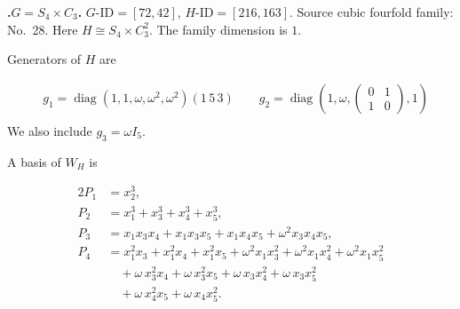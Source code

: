 \documentclass[12pt]{amsart}
\numberwithin{equation}{section}
\theoremstyle{plain}
\theoremstyle{definition}
\theoremstyle{remark}
\DeclareMathOperator{\diag}{diag}
\newenvironment{familydisplay}{%
  \begingroup
  \setlength{\arraycolsep}{1.35pt}%
  \renewcommand{\arraystretch}{0.96}%
  \setlength{\jot}{2pt}%
}{\endgroup}
\newcommand{\smat}[1]{\left(\begin{smallmatrix}#1\end{smallmatrix}\right)}
\begin{document}
\par{}\medskip\noindent\textbf{.\enspace $G=S_4\times C_3$.}\label{fam:threefold-no-6}
$G\text{-ID}=[72,42]$, $H\text{-ID}=[216,163]$.
Source cubic fourfold family: No.~28.  Here
$H\cong S_4\times C_3^2$.
The family dimension is $1$.
\par\smallskip\noindent Generators of $H$ are\par\nopagebreak
\begin{familydisplay}
\begin{align*}
&g_{1}=\diag(1,1,\omega,\omega^2,\omega^2)(1\,5\,3)
\qquad g_{2}=\diag\!\left(1,\omega,\smat{0&1\\1&0},1\right)\\
\end{align*}
\end{familydisplay}
\noindent We also include $g_{3}=\omega I_5$.
\par\smallskip\noindent A basis of $W_H$ is\par\nopagebreak
\begin{familydisplay}
\begin{alignat*}{2}
P_{1}&=x_{2}^{3},\\[2pt]
P_{2}&=x_{1}^{3}+x_{3}^{3}+x_{4}^{3}+x_{5}^{3},\\[2pt]
P_{3}&=x_{1}x_{3}x_{4}+x_{1}x_{3}x_{5}+x_{1}x_{4}x_{5}+\omega^2x_{3}x_{4}x_{5},\\[2pt]
P_{4}&=x_{1}^{2}x_{3}+x_{1}^{2}x_{4}+x_{1}^{2}x_{5}+\omega^2x_{1}x_{3}^{2}+\omega^2x_{1}x_{4}^{2}+\omega^2x_{1}x_{5}^{2}\\
&\quad +\omega\,x_{3}^{2}x_{4}+\omega\,x_{3}^{2}x_{5}+\omega\,x_{3}x_{4}^{2}+\omega\,x_{3}x_{5}^{2}\\
&\quad +\omega\,x_{4}^{2}x_{5}+\omega\,x_{4}x_{5}^{2}.\\[2pt]
\end{alignat*}
\end{familydisplay}
\end{document}

